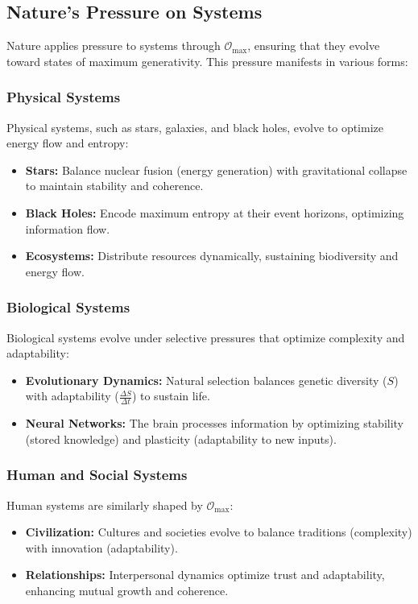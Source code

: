 \documentclass[12pt]{article}
\begin{document}
\subsection{Nature’s Pressure on Systems}
Nature applies pressure to systems through \( \mathcal{O}_{\text{max}} \), ensuring that they evolve toward states of maximum generativity. This pressure manifests in various forms:

\subsubsection{Physical Systems}
Physical systems, such as stars, galaxies, and black holes, evolve to optimize energy flow and entropy:
\begin{itemize}
    \item \textbf{Stars:} Balance nuclear fusion (energy generation) with gravitational collapse to maintain stability and coherence.
    \item \textbf{Black Holes:} Encode maximum entropy at their event horizons, optimizing information flow.
    \item \textbf{Ecosystems:} Distribute resources dynamically, sustaining biodiversity and energy flow.
\end{itemize}

\subsubsection{Biological Systems}
Biological systems evolve under selective pressures that optimize complexity and adaptability:
\begin{itemize}
    \item \textbf{Evolutionary Dynamics:} Natural selection balances genetic diversity (\( S \)) with adaptability (\( \frac{\Delta S}{\Delta t} \)) to sustain life.
    \item \textbf{Neural Networks:} The brain processes information by optimizing stability (stored knowledge) and plasticity (adaptability to new inputs).
\end{itemize}

\subsubsection{Human and Social Systems}
Human systems are similarly shaped by \( \mathcal{O}_{\text{max}} \):
\begin{itemize}
    \item \textbf{Civilization:} Cultures and societies evolve to balance traditions (complexity) with innovation (adaptability).
    \item \textbf{Relationships:} Interpersonal dynamics optimize trust and adaptability, enhancing mutual growth and coherence.
\end{itemize}
\end{document}
